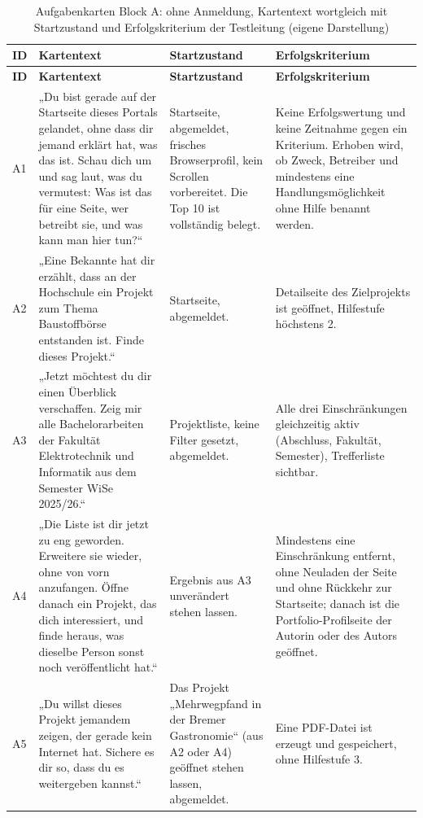 \begingroup
\scriptsize
\setlength{\tabcolsep}{3pt}
\renewcommand{\arraystretch}{1.12}
\setlength{\LTcapwidth}{\textwidth}
\begin{longtable}{@{}L{0.6cm}L{6.1cm}L{3.8cm}L{4.2cm}@{}}
	\caption[Aufgabenkarten Block A: ohne Anmeldung]{Aufgabenkarten Block A: ohne Anmeldung, Kartentext wortgleich mit Startzustand und Erfolgskriterium der Testleitung (eigene Darstellung)}
	\label{tab:karten-a}\\
	\toprule
	\textbf{ID} & \textbf{Kartentext} & \textbf{Startzustand} & \textbf{Erfolgskriterium} \\
	\midrule
	\endfirsthead
	\toprule
	\textbf{ID} & \textbf{Kartentext} & \textbf{Startzustand} & \textbf{Erfolgskriterium} \\
	\midrule
	\endhead
	\bottomrule
	\endfoot
	A1 & „Du bist gerade auf der Startseite dieses Portals gelandet, ohne dass dir jemand erklärt hat, was das ist. Schau dich um und sag laut, was du vermutest: Was ist das für eine Seite, wer betreibt sie, und was kann man hier tun?“ & Startseite, abgemeldet, frisches Browserprofil, kein Scrollen vorbereitet. Die Top 10 ist vollständig belegt. & Keine Erfolgswertung und keine Zeitnahme gegen ein Kriterium. Erhoben wird, ob Zweck, Betreiber und mindestens eine Handlungsmöglichkeit ohne Hilfe benannt werden. \\
	A2 & „Eine Bekannte hat dir erzählt, dass an der Hochschule ein Projekt zum Thema Baustoffbörse entstanden ist. Finde dieses Projekt.“ & Startseite, abgemeldet. & Detailseite des Zielprojekts ist geöffnet, Hilfestufe höchstens 2. \\
	A3 & „Jetzt möchtest du dir einen Überblick verschaffen. Zeig mir alle Bachelorarbeiten der Fakultät Elektrotechnik und Informatik aus dem Semester WiSe 2025/26.“ & Projektliste, keine Filter gesetzt, abgemeldet. & Alle drei Einschränkungen gleichzeitig aktiv (Abschluss, Fakultät, Semester), Trefferliste sichtbar. \\
	A4 & „Die Liste ist dir jetzt zu eng geworden. Erweitere sie wieder, ohne von vorn anzufangen. Öffne danach ein Projekt, das dich interessiert, und finde heraus, was dieselbe Person sonst noch veröffentlicht hat.“ & Ergebnis aus A3 unverändert stehen lassen. & Mindestens eine Einschränkung entfernt, ohne Neuladen der Seite und ohne Rückkehr zur Startseite; danach ist die Portfolio-Profilseite der Autorin oder des Autors geöffnet. \\
	A5 & „Du willst dieses Projekt jemandem zeigen, der gerade kein Internet hat. Sichere es dir so, dass du es weitergeben kannst.“ & Das Projekt „Mehrwegpfand in der Bremer Gastronomie“ (aus A2 oder A4) geöffnet stehen lassen, abgemeldet. & Eine PDF-Datei ist erzeugt und gespeichert, ohne Hilfestufe 3. \\
\end{longtable}
\endgroup

